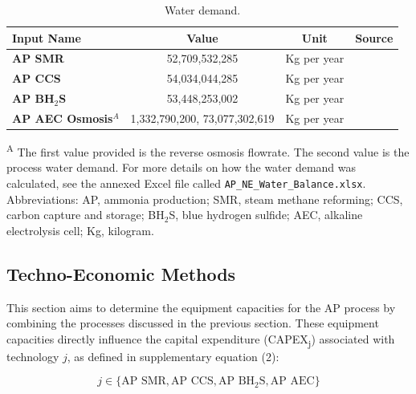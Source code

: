 \documentclass{article}
\begin{document}
\begin{table}[H]
  \centering
  \caption{Water demand.}
  \label{table:si_technical8_water_demand}
  \begin{threeparttable}
    \begin{tabular}{@{}lccc@{}}
      \toprule
      \textbf{Input Name} & \textbf{Value} & \textbf{Unit} & \textbf{Source} \\ \midrule
      \textbf{AP SMR} & 52,709,532,285 & Kg per year & \cite{LEWIS2022,Brasington2011,Young2021,Spath2005} \\
      \textbf{AP CCS} & 54,034,044,285 & Kg per year & \\
      \textbf{AP BH$_2$S} & 53,448,253,002 & Kg per year & \\
      \textbf{AP AEC Osmosis$^A$} & 1,332,790,200, 73,077,302,619 & Kg per year & \cite{LEWIS2022,Brasington2011,Young2021,Sousa2022} \\ \bottomrule
    \end{tabular}
    \begin{tablenotes}
      \small
      \item \textsuperscript{A} The first value provided is the reverse osmosis flowrate. The second value is the process water demand. For more details on how the water demand was calculated, see the annexed Excel file called \texttt{AP\_NE\_Water\_Balance.xlsx}. Abbreviations: AP, ammonia production; SMR, steam methane reforming; CCS, carbon capture and storage; BH$_2$S, blue hydrogen sulfide; AEC, alkaline electrolysis cell; Kg, kilogram.
    \end{tablenotes}
  \end{threeparttable}
\end{table}


\subsection{Techno-Economic Methods}

This section aims to determine the equipment capacities for the AP process by combining the processes discussed in the previous section. These equipment capacities directly influence the capital expenditure (CAPEX\textsubscript{j}) associated with technology \( j \), as defined in supplementary equation (2):

\begin{equation}
j \in \{\text{AP SMR}, \text{AP CCS}, \text{AP BH}_2\text{S}, \text{AP AEC}\}
\label{eq:S2}
\end{equation}
\end{document}
